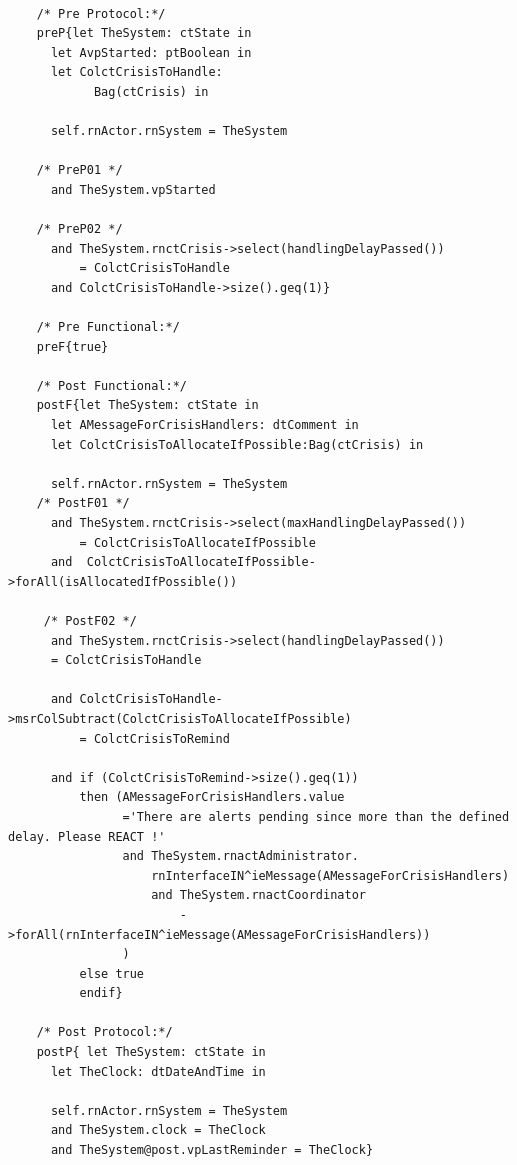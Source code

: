 	\scriptsize
	\vspace{0.5cm}
	\begin{lstlisting}[style=MessirStyle,firstnumber=auto,captionpos=b,caption={\msrmessir (MCL-oriented) specification of the operation \emph{oeSollicitateCrisisHandling}.},label=OM-actActivator-oeSollicitateCrisisHandling-MCL-LST]

	/* Pre Protocol:*/ 
	preP{let TheSystem: ctState in
	  let AvpStarted: ptBoolean in
	  let ColctCrisisToHandle:
	        Bag(ctCrisis) in
	  
	  self.rnActor.rnSystem = TheSystem
	    
	/* PreP01 */
	  and TheSystem.vpStarted
	  
	/* PreP02 */
	  and TheSystem.rnctCrisis->select(handlingDelayPassed()) 
	      = ColctCrisisToHandle
	  and ColctCrisisToHandle->size().geq(1)}
	
	/* Pre Functional:*/
	preF{true}
	
	/* Post Functional:*/ 
	postF{let TheSystem: ctState in
	  let AMessageForCrisisHandlers: dtComment in
	  let ColctCrisisToAllocateIfPossible:Bag(ctCrisis) in
	  
	  self.rnActor.rnSystem = TheSystem
	/* PostF01 */
	  and TheSystem.rnctCrisis->select(maxHandlingDelayPassed())
	      = ColctCrisisToAllocateIfPossible
	  and  ColctCrisisToAllocateIfPossible->forAll(isAllocatedIfPossible())
	
	 /* PostF02 */
	  and TheSystem.rnctCrisis->select(handlingDelayPassed())
	  = ColctCrisisToHandle
	  
	  and ColctCrisisToHandle->msrColSubtract(ColctCrisisToAllocateIfPossible)
	      = ColctCrisisToRemind
	      
	  and if (ColctCrisisToRemind->size().geq(1))
	      then (AMessageForCrisisHandlers.value
	            ='There are alerts pending since more than the defined delay. Please REACT !'
	            and TheSystem.rnactAdministrator.
	                rnInterfaceIN^ieMessage(AMessageForCrisisHandlers)
	                and TheSystem.rnactCoordinator
	                    ->forAll(rnInterfaceIN^ieMessage(AMessageForCrisisHandlers))
	            )
	      else true
	      endif}
	
	/* Post Protocol:*/ 
	postP{ let TheSystem: ctState in
	  let TheClock: dtDateAndTime in
	  
	  self.rnActor.rnSystem = TheSystem
	  and TheSystem.clock = TheClock
	  and TheSystem@post.vpLastReminder = TheClock}
	
	\end{lstlisting}
	\normalsize 
	
